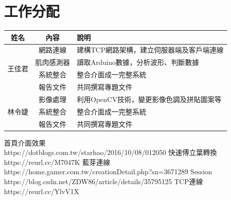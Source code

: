 \documentclass[12pt]{article}  %
\theoremstyle{plain}
\begin{document}
\section{工作分配}
\begin{tabular}{|c|c|p{9.5cm}|}
\hline
\cellcolor[HTML]{B2BEB5}姓名 & \cellcolor[HTML]{B2BEB5}內容 & \cellcolor[HTML]{B2BEB5}說明\\
\hline\hline
\multirow{4}{*}{王佳君} & 網路連線 & 建構TCP網路架構，建立伺服器端及客戶端連線 \\
\cline{2-3}
\multirow{4}{*}{} & 肌肉感測器 & 讀取Arduino數據，分析波形、判斷數據 \\
\cline{2-3}
\multirow{4}{*}{} & 系統整合 & 整合介面成一完整系統 \\
\cline{2-3}
\cline{2-3}
\multirow{4}{*}{} & 報告文件 & 共同撰寫專題文件 \\
\hline
\multirow{3}{*}{林令婕} & 影像處理 & 利用OpenCV技術，變更影像色調及拼貼圖案等 \\
\cline{2-3}
\multirow{3}{*}{} & 系統整合 & 整合介面成一完整系統 \\
\cline{2-3}
\cline{2-3}
\multirow{3}{*}{} & 報告文件 & 共同撰寫專題文件 \\
\hline
\end{tabular}
\newpage




\begin{thebibliography}{99}  %
首頁介面效果\\
https://dotblogs.com.tw/starhao/2016/10/08/012050
快速傅立葉轉換\\
https://reurl.cc/M7047K
藍芽連線\\
https://home.gamer.com.tw/creationDetail.php?sn=3671289
Session\\
https://blog.csdn.net/ZDW86/article/details/35795125
TCP連線\\
https://reurl.cc/YlvV1X
\end{thebibliography}
\newpage
\end{document}
